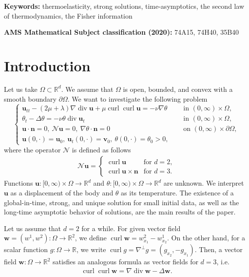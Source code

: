 \documentclass[11pt]{article}
\numberwithin{equation}{section}
\theoremstyle{plain}
\newcommand\bb[1]{\mathbf{#1}}
\renewcommand{\r}{\mathbb{R}}
\newcommand{\rn}{\mathbb{R}^d}
\renewcommand{\div}{\operatorname{div}}
\DeclareMathOperator{\curl}{curl}
\newcommand{\ot}{(0,\infty)\times\Omega}
\newcommand{\bu}{\bb{u}}
\newcommand{\N}{\mathcal{N}}
\begin{document}
\medskip

\noindent
\textbf{Keywords:} {thermoelasticity, strong solutions, time-asymptotics, the second law of thermodynamics, the Fisher information}
\medskip

\noindent
\textbf{AMS Mathematical Subject classification (2020):} {74A15, 74H40, 35B40}
\medskip	
	
	
\section{Introduction}

Let us take $\Omega\subset\rn$. We assume that $\Omega$ is open, bounded, and convex with a smooth boundary $\partial\Omega$. We want to investigate the following problem
\begin{equation}\label{system}
\begin{cases}
\bb{u}_{tt}- (2\mu+\lambda)\nabla\div\bb u+\mu\curl\curl\bb u =-\nu\nabla\theta & \quad \text{ in } \ot,\\
\theta_t - \Delta \theta =- \nu\theta \div\bb{u}_t& \quad \text{ in }  \ot,\\
\bb u\cdot\bb n=0,\ \N\bb u=0,\ \nabla\theta\cdot\bb n=0 &\quad\text{ on } (0,\infty)\times\partial\Omega,\\
\bb{u}(0,\cdot)=\bb{u}_0,\ \bb{u}_t(0,\cdot) = \bb{v}_0,\ \theta(0,\cdot)=\theta_0>0,&
\end{cases}
\end{equation}
where the operator $\N$ is defined as follows
\begin{align*}
\N\bb u=
\begin{cases}
\curl\bb u& \textrm{for }d=2,\\
\curl\bb u\times\bb n&\textrm{for }d=3.
\end{cases}
\end{align*}
Functions $\bb u\colon [0,\infty)\times\Omega\to\rn$ and $\theta\colon [0,\infty)\times\Omega\to\rn$ are unknown. We interpret $\bu$ as a displacement of the body and $\theta$ as its temperature. The existence of a global-in-time, strong, and unique solution for small initial data, as well as the long-time asymptotic behavior of solutions, are the main results of the paper.

Let us assume that $d=2$ for a while. For given vector field $\bb w=(w^1,w^2)\colon\Omega\to\r^2$, we define $\curl\bb w=w_{x_1}^2-w^1_{x_2}$. On the other hand, for a scalar function $g\colon\Omega\to\r$, we write $\curl g=\nabla^{\perp} g=(g_{x_2},-g_{x_1})$. Then, a vector field $\bb w\colon\Omega\to\r^2$ satisfies an analogous formula as vector fields for $d=3$, i.e.
\begin{align*}
\curl\curl\bb w=\nabla\div\bb w-\Delta\bb w.
\end{align*}
\end{document}
